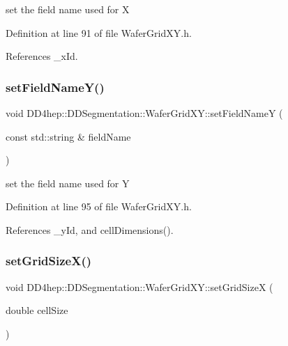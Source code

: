 set the field name used for X 



Definition at line 91 of file Wafer\+Grid\+X\+Y.\+h.



References \+\_\+x\+Id.

\hypertarget{class_d_d4hep_1_1_d_d_segmentation_1_1_wafer_grid_x_y_a7ec7eba050ae07e10694ff0666a10d35}{}\label{class_d_d4hep_1_1_d_d_segmentation_1_1_wafer_grid_x_y_a7ec7eba050ae07e10694ff0666a10d35} 
\subsubsection{\texorpdfstring{set\+Field\+Name\+Y()}{setFieldNameY()}}
{\footnotesize\ttfamily void D\+D4hep\+::\+D\+D\+Segmentation\+::\+Wafer\+Grid\+X\+Y\+::set\+Field\+NameY (\begin{DoxyParamCaption}\item[{const std\+::string \&}]{field\+Name }\end{DoxyParamCaption})\hspace{0.3cm}{\ttfamily [inline]}}



set the field name used for Y 



Definition at line 95 of file Wafer\+Grid\+X\+Y.\+h.



References \+\_\+y\+Id, and cell\+Dimensions().

\hypertarget{class_d_d4hep_1_1_d_d_segmentation_1_1_wafer_grid_x_y_a890894a5afd02db5c888fba69c5489d7}{}\label{class_d_d4hep_1_1_d_d_segmentation_1_1_wafer_grid_x_y_a890894a5afd02db5c888fba69c5489d7} 
\subsubsection{\texorpdfstring{set\+Grid\+Size\+X()}{setGridSizeX()}}
{\footnotesize\ttfamily void D\+D4hep\+::\+D\+D\+Segmentation\+::\+Wafer\+Grid\+X\+Y\+::set\+Grid\+SizeX (\begin{DoxyParamCaption}\item[{double}]{cell\+Size }\end{DoxyParamCaption})\hspace{0.3cm}{\ttfamily [inline]}}




